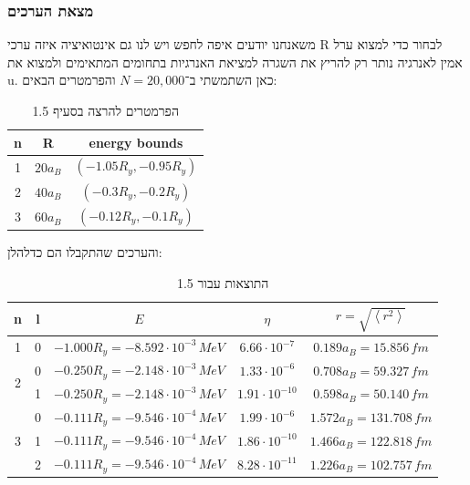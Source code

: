 \documentclass{article}
\begin{document}
\subsubsection*{מצאת הערכים}
משאנחנו יודעים איפה לחפש ויש לנו גם אינטואיציה איזה ערכי R לבחור כדי למצוא ערל אמין לאנרגיה נותר רק להריץ את השגרה למציאת האנרגיות בתחומים המתאימים ולמצוא את u.
כאן השתמשתי ב־$N=20,000$ והפרמטרים הבאים:

\begin{table}[H]
    \centering
    \renewcommand{\arraystretch}{1.3} 
    \caption{הפרמטרים להרצה בסעיף 1.5}
    \begin{english}\begin{tabular}{|c|c|c|}
        \hline
        n & R & energy bounds \\
        \hline
        1 & $20a_B$ & $(-1.05R_y,-0.95R_y)$ \\
        \hline
        2 & $40a_B$ & $(-0.3R_y,-0.2R_y)$ \\
        \hline
        3 & $60a_B$ & $(-0.12R_y,-0.1R_y)$ \\
        \hline
    \end{tabular}\end{english}
\end{table}

\noindent והערכים שהתקבלו הם כדלהלן:

\begin{table}[H]
    \centering
    \renewcommand{\arraystretch}{1.3} 
    \caption{התוצאות עבור 1.5}
    \begin{english}\begin{tabular}{|c|c|c|c|c|}
        \hline
        n & l & $E$ & $\eta$ & $r=\sqrt{\left<r^2\right>}$ \\
        \hline
        \multirow{1}{*}{1} & 0 & $-1.000R_y = -8.592\cdot{10}^{-3}\,MeV$ & $6.66\cdot{10}^{-7}$ & $0.189a_B = 15.856\,fm$ \\
        \hline
        \multirow{2}{*}{2} & 0 & $-0.250R_y = -2.148\cdot{10}^{-3}\,MeV$ & $1.33\cdot{10}^{-6}$ & $0.708a_B = 59.327\,fm$ \\
        \cline{2-5}
         & 1 & $-0.250R_y = -2.148\cdot{10}^{-3}\,MeV$ & $1.91\cdot{10}^{-10}$ & $0.598a_B = 50.140\,fm$ \\
        \hline
        \multirow{3}{*}{3} & 0 & $-0.111R_y = -9.546\cdot{10}^{-4}\,MeV$ & $1.99\cdot{10}^{-6}$ & $1.572a_B = 131.708\,fm$ \\
        \cline{2-5}
         & 1 & $-0.111R_y = -9.546\cdot{10}^{-4}\,MeV$ & $1.86\cdot{10}^{-10}$ & $1.466a_B = 122.818\,fm$ \\
        \cline{2-5}
         & 2 & $-0.111R_y = -9.546\cdot{10}^{-4}\,MeV$ & $8.28\cdot{10}^{-11}$ & $1.226a_B = 102.757\,fm$ \\
        \hline
    \end{tabular}\end{english}
\end{table}
\vspace{1cm}
\end{document}
